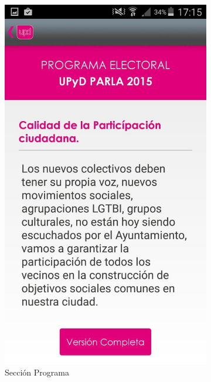 \begin{figure}[H]
\begin{subfigure}[b]{0.3\textwidth}
                \includegraphics[width=\textwidth]{Media/Captures/UPyDParlaSection.jpg}
                \caption{Sección Programa}
                \label{fig:upydSection}
        \end{subfigure}
        ~
        \begin{subfigure}[b]{0.3\textwidth}

\end{subfigure}
\end{figure}
